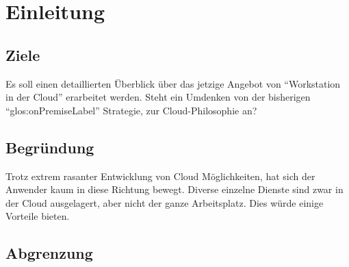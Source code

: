 \chapter{Einleitung}

\section{Ziele}
Es soll einen detaillierten Überblick über das jetzige Angebot von “Workstation in der Cloud” erarbeitet werden.
Steht ein Umdenken von der bisherigen "`\gls{glos:onPremiseLabel}"' Strategie, zur Cloud-Philosophie an?

\section{Begründung}
Trotz extrem rasanter Entwicklung von Cloud Möglichkeiten, hat sich der Anwender kaum in diese Richtung bewegt.
Diverse einzelne Dienste sind zwar in der Cloud ausgelagert, aber nicht der ganze Arbeitsplatz. Dies würde einige Vorteile bieten.

\section{Abgrenzung}
